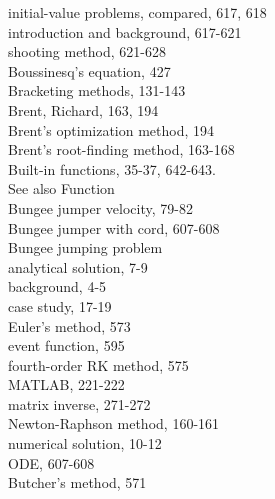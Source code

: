 \documentclass[../main.tex]{subfiles}
\begin{document}
\begin{multicols}{3}
    \hspace*{3mm}initial-value problems, compared, 617, 618\\
    \hspace*{3mm}introduction and background, 617-621\\
    \hspace*{3mm}shooting method, 621-628\\
    Boussinesq's equation, 427\\
    Bracketing methods, 131-143\\
    Brent, Richard, 163, 194\\
    Brent's optimization method, 194\\
    Brent's root-finding method, 163-168\\
    Built-in functions, 35-37, 642-643. \\
    \hspace*{3mm}See also Function\\
    Bungee jumper velocity, 79-82\\
    Bungee jumper with cord, 607-608\\
    Bungee jumping problem\\
    \hspace*{3mm}analytical solution, 7-9\\
    \hspace*{3mm}background, 4-5\\
    \hspace*{3mm}case study, 17-19\\
    \hspace*{3mm}Euler's method, 573\\
    \hspace*{3mm}event function, 595\\
    \hspace*{3mm}fourth-order RK method, 575\\
    \hspace*{3mm}MATLAB, 221-222\\
    \hspace*{3mm}matrix inverse, 271-272\\
    \hspace*{3mm}Newton-Raphson method, 160-161\\
    \hspace*{3mm}numerical solution, 10-12\\
    \hspace*{3mm}ODE, 607-608\\
    Butcher's method, 571\\

\end{multicols}
\end{document}
